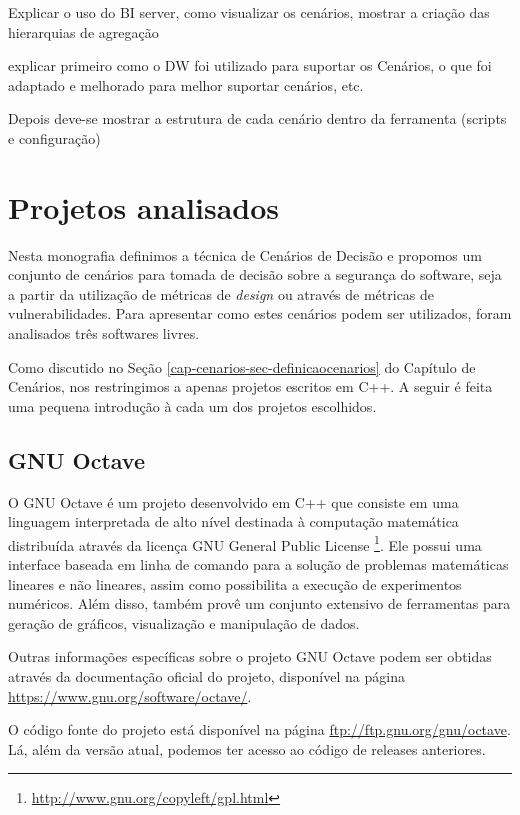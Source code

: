 Explicar o uso do BI server, como visualizar os cenários, mostrar a criação das hierarquias de agregação





explicar primeiro como o DW foi utilizado para suportar os Cenários, o que foi adaptado e melhorado para melhor suportar cenários, etc.

Depois deve-se mostrar a estrutura de cada cenário dentro da ferramenta (scripts e configuração)

\section{Projetos analisados}
\label{cap-projects}

Nesta monografia definimos a técnica de Cenários de Decisão e propomos um conjunto de cenários para tomada de decisão sobre a segurança do software, seja a partir da utilização de métricas de \emph{design} ou através de métricas de vulnerabilidades. Para apresentar como estes cenários podem ser utilizados, foram analisados três softwares livres. 

Como discutido no Seção \ref{cap-cenarios-sec-definicaocenarios} do Capítulo de Cenários, nos restringimos a apenas projetos escritos em C++. A seguir é feita uma pequena introdução à cada um dos projetos escolhidos.

\subsection{GNU Octave}
\label{section-octave}

O GNU Octave é um projeto desenvolvido em C++ que consiste em uma linguagem interpretada de alto nível destinada à computação matemática distribuída através da licença GNU General Public License \footnote{\url{http://www.gnu.org/copyleft/gpl.html}}. Ele possui uma interface baseada em linha de comando para a solução de problemas matemáticas lineares e não lineares, assim como possibilita a execução de experimentos numéricos. Além disso, também provê um conjunto extensivo de ferramentas para geração de gráficos, visualização e manipulação de dados.

Outras informações específicas sobre o projeto GNU Octave podem ser obtidas através da documentação oficial do projeto, disponível na página \url{https://www.gnu.org/software/octave/}.

O código fonte do projeto está disponível na página \url{ftp://ftp.gnu.org/gnu/octave}. Lá, além da versão atual, podemos ter acesso ao código de releases anteriores.

